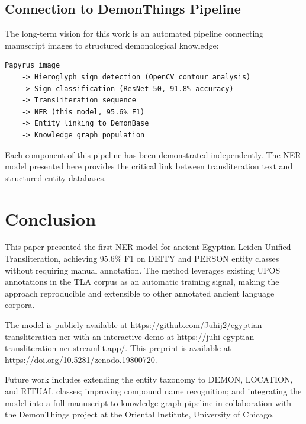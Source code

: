 \documentclass[11pt]{article}
\begin{document}
\subsection{Connection to DemonThings Pipeline}

The long-term vision for this work is an automated pipeline connecting manuscript images to structured demonological knowledge:

\begin{lstlisting}
Papyrus image
    -> Hieroglyph sign detection (OpenCV contour analysis)
    -> Sign classification (ResNet-50, 91.8% accuracy)
    -> Transliteration sequence
    -> NER (this model, 95.6% F1)
    -> Entity linking to DemonBase
    -> Knowledge graph population
\end{lstlisting}

Each component of this pipeline has been demonstrated independently. The NER model presented here provides the critical link between transliteration text and structured entity databases.

\section{Conclusion}

This paper presented the first NER model for ancient Egyptian Leiden Unified Transliteration, achieving 95.6\% F1 on DEITY and PERSON entity classes without requiring manual annotation. The method leverages existing UPOS annotations in the TLA corpus as an automatic training signal, making the approach reproducible and extensible to other annotated ancient language corpora.

The model is publicly available at \url{https://github.com/Juhij2/egyptian-transliteration-ner} with an interactive demo at \url{https://juhi-egyptian-transliteration-ner.streamlit.app/}. This preprint is available at \url{https://doi.org/10.5281/zenodo.19800720}.

Future work includes extending the entity taxonomy to DEMON, LOCATION, and RITUAL classes; improving compound name recognition; and integrating the model into a full manuscript-to-knowledge-graph pipeline in collaboration with the DemonThings project at the Oriental Institute, University of Chicago.



\end{document}
